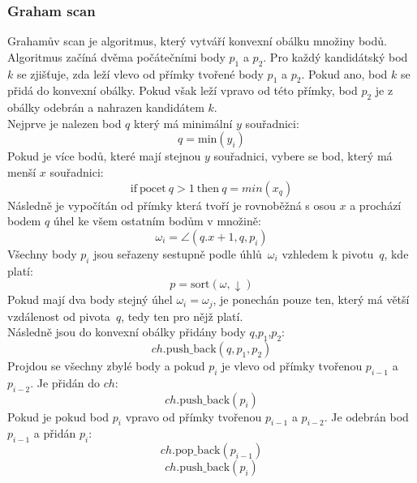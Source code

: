 \subsubsection{Graham scan}
Grahamův scan je algoritmus, který vytváří konvexní obálku množiny bodů. Algoritmus začíná dvěma počátečními body $p_1$ a $p_2$. Pro každý kandidátský bod $k$ se zjišťuje, zda leží vlevo od přímky tvořené body $p_1$ a $p_2$. Pokud ano, bod $k$ se přidá do konvexní obálky. Pokud však leží vpravo od této přímky, bod $p_2$ je z obálky odebrán a nahrazen kandidátem $k$.\\

\hspace{-1.15cm}
Nejprve je nalezen bod $q$ který má minimální $y$ souřadnici: 
\begin{equation}
    q = \text{min}(y_i)
\end{equation}
Pokud je více bodů, které mají stejnou $y$ souřadnici, vybere se bod, který má menší $x$ souřadnici:
\begin{equation}
    \text{if}~\text{pocet}~q>1~\text{then}~q = {min}(x_q)
\end{equation}
Následně je vypočítán od přímky která tvoří je rovnoběžná s osou $x$ a prochází bodem $q$ úhel ke všem ostatním bodům v množině:
\begin{equation}
    \omega _i = \angle( q.x+1,q,p_i)
\end{equation}
Všechny body $p_i$ jsou seřazeny sestupně podle úhlů~$\omega_i$ vzhledem k pivotu~$q$, kde platí:
\begin{equation}
    p = \text{sort}(\omega,\downarrow)
\end{equation}
Pokud mají dva body stejný úhel $\omega_i = \omega_j$, je ponechán pouze ten, který má větší vzdálenost od pivota~$q$, tedy ten pro nějž platí.\\
Následně jsou do konvexní obálky přidány body $q$,$p_1$,$p_2$:
\begin{equation}
    ch.\text{push\_back}(q,p_1,p_2)
\end{equation}
Projdou se všechny zbylé body a pokud $p_{i}$ je vlevo od přímky tvořenou $p_{i-1}$ a $p_{i-2}$. Je přidán do $ch$:
\begin{equation}
    ch.\text{push\_back}(p_{i})
\end{equation}
Pokud je pokud bod $p_{i}$ vpravo od přímky tvořenou $p_{i-1}$ a $p_{i-2}$. Je odebrán bod $p_{i-1}$ a přidán $p_{i}$:
\begin{equation}
    ch.\text{pop\_back}(p_{i-1})
\end{equation}
\begin{equation}
    ch.\text{push\_back}(p_{i})
\end{equation}

\newpage

